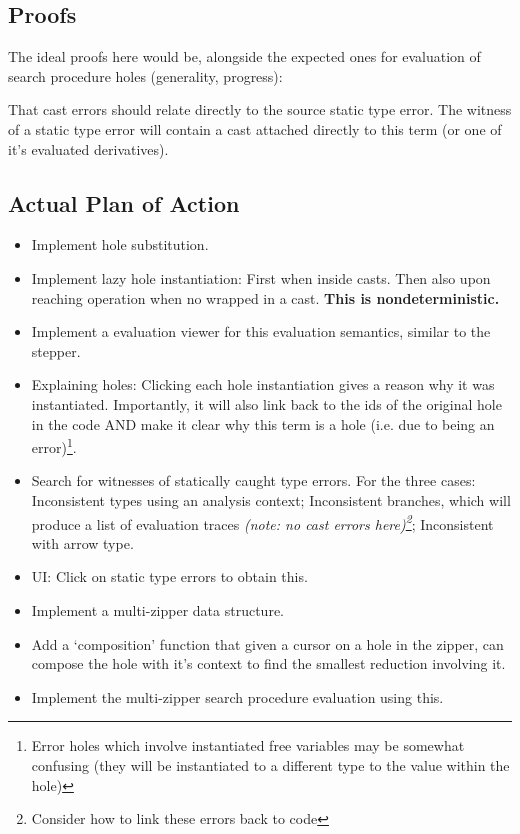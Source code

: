 \subsection{Proofs}
The ideal proofs here would be, alongside the expected ones for evaluation of search procedure holes (generality, progress):\par 
That cast errors should relate directly to the source static type error. The witness of a static type error will contain a cast attached directly to this term (or one of it's evaluated derivatives).

\subsection{Actual Plan of Action}
\begin{itemize}
\item Implement hole substitution.
\item Implement lazy hole instantiation: First when inside casts. Then also upon reaching operation when no wrapped in a cast. \textbf{This is nondeterministic.}
\item Implement a evaluation viewer for this evaluation semantics, similar to the stepper.
\item Explaining holes: Clicking each hole instantiation gives a reason why it was instantiated. Importantly, it will also link back to the ids of the original hole in the code AND make it clear why this term is a hole (i.e. due to being an error)\footnote{Error holes which involve instantiated free variables may be somewhat confusing (they will be instantiated to a different type to the value within the hole)}.
\item Search for witnesses of statically caught type errors. For the three cases: Inconsistent types using an analysis context; Inconsistent branches, which will produce a list of evaluation traces \textit{(note: no cast errors here)\footnote{Consider how to link these errors back to code}}; Inconsistent with arrow type.
\item UI: Click on static type errors to obtain this.
\item Implement a multi-zipper data structure. \cite{MultiZipper}
\item Add a `composition' function that given a cursor on a hole in the zipper, can compose the hole with it's context to find the smallest reduction involving it.
\item Implement the multi-zipper search procedure evaluation using this.
\end{itemize}